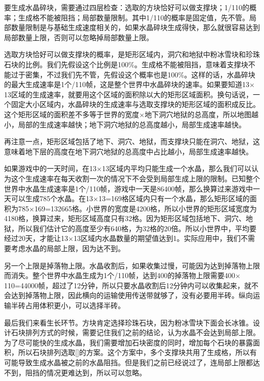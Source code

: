要生成水晶碎块，需要通过四层检查：选取的方块恰好可以做支撑块；1/110的概率；生成格不能被阻挡；局部数量限制。其中1/110的概率是固定值，先不管。局部数量限制是与基础生成速度相关的，如果水晶碎块生成得快，那么就很容易达到局部数量上限，否则可以忽略掉局部数量上限。

选取方块恰好可以做支撑块的概率，是矩形区域内，洞穴和地狱中粉冰雪块和珍珠石块的比例。我们先假设这个比例是100\%。生成格不能被阻挡，意味着支撑块不能过于密集，不过我们先不管，先假设这个概率也是100\%。这样的话，水晶碎块的最大生成速率是1个/110帧，这是整个世界中水晶碎块的速率。如果要知道13$\times$13区域的生成速率，就要用这个区域的面积除以大的矩形区域面积。换句话说，一个固定大小区域内，水晶碎块的生成速率与选取支撑块的矩形区域的面积成反比。这个矩形区域的面积差不多等于世界的宽度$\times$地下洞穴地狱的总高度，所以地图越小，局部的生成速率越快；地下洞穴地狱的总高度越小，局部生成速率越快。

再注意一点，矩形区域包括了地下、洞穴、地狱，而支撑块只能在洞穴、地狱，这意味着地下层的高度在地下洞穴地狱的总高度中占比越小，局部生成速率越快。

如果游戏中的一天时间，在13$\times$13区域内平均只能生成一个水晶，那么我们可以认为这个生成速率在每天收割一次的情况下不会受到局部生成上限的限制。已知整个世界中水晶生成速率是1个/110帧，游戏中一天是86400帧，那么换算过来游戏中一天可以生成785个水晶。在13$\times$13=169格区域内只有一个水晶，那么矩形区域的面积为785$\times$169=132665格。小世界的宽度是4200格，所以小世界的矩形区域宽度为4180格，换算过来，矩形区域高度只有32格。因为矩形区域包括地下、洞穴、地狱，所以我们估计它的高度至少有640格，为32格的20倍。所以小世界中，平均要经过20天，才能让13$\times$13区域内水晶数量的期望值达到1。实际应用中，我们不需要考虑水晶的局部上限，因为达不到。

另一个上限是掉落物上限。水晶收割后，如果收集过慢，可能因为达到掉落物上限而消失。整个世界中水晶生成为1个/110帧，达到400的掉落物上限需要400$\times$110=44000帧，超过了12分钟，所以只要水晶收割后12分钟内可以收集起来，就不会达到掉落物上限，因此横向的运输使用传送带就够了，没有必要用半砖。纵向运输半砖占用体积更小，可以选择半砖。

最后我们来看生长环节。方块肯定选择珍珠石块，因为粉冰雪块下面会长冰锥。设计石块排列方式的时候，需要记住我们之前的结论，认为水晶不会达到局部上限。为了尽可能快的生成水晶，我们需要增加石块密度的同时，增加每个石块的暴露面积，所以石块排列选取\autoref{}的方案。这个方案中，多个支撑块共用了生成格，所以有可能导致生成水晶被之前的水晶阻挡。但是我们之前已经说过了，连局部上限都达不到，阻挡的情况更难达到，所以可以忽略。